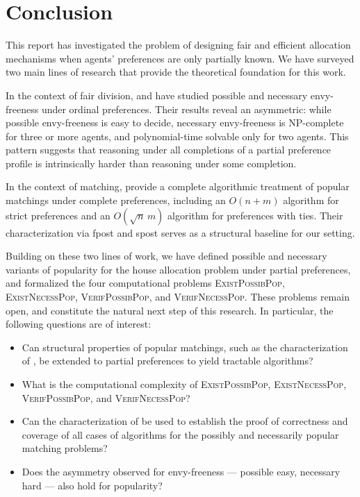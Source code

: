 \documentclass{article}
\begin{document}
\section{Conclusion}


This report has investigated the problem of designing fair and efficient allocation mechanisms when agents' preferences are only partially known. 
We have surveyed two main lines of research that provide the theoretical foundation for this work.

In the context of fair division, \cite{bouveret2010fair} and \cite{aziz2024computational} have studied possible and necessary envy-freeness under ordinal preferences. 
Their results reveal an asymmetric: while possible envy-freeness is easy to decide, necessary envy-freeness is NP-complete for three or more agents, and polynomial-time solvable only for two agents. 
This pattern suggests that reasoning under all completions of a partial preference profile is intrinsically harder than reasoning under some completion.

In the context of matching, \cite{abraham2007popular} provide a complete algorithmic treatment of popular matchings under complete preferences, including an $O(n+m)$ algorithm for strict preferences and an $O(\sqrt{n}\,m)$ algorithm for preferences with ties. 
Their characterization via fpost and spost serves as a structural baseline for our setting.

Building on these two lines of work, we have defined possible and necessary variants of popularity for the house allocation problem under partial preferences, and formalized the four computational problems \textsc{ExistPossibPop}, \textsc{ExistNecessPop}, \textsc{VerifPossibPop}, and \textsc{VerifNecessPop}. 
These problems remain open, and constitute the natural next step of this research. 
In particular, the following questions are of interest:
\begin{itemize}
    \item Can structural properties of popular matchings, such as the characterization of \cite{abraham2007popular}, be extended to partial preferences to yield tractable algorithms?
    \item What is the computational complexity of \textsc{ExistPossibPop}, \textsc{ExistNecessPop}, \textsc{VerifPossibPop}, and \textsc{VerifNecessPop}?
    \item Can the characterization of \cite{abraham2007popular} be used to establish the proof of correctness and coverage of all cases of algorithms for the possibly and necessarily popular matching problems?
    \item Does the asymmetry observed for envy-freeness --- possible easy, necessary hard --- also hold for popularity?
\end{itemize}
\end{document}
